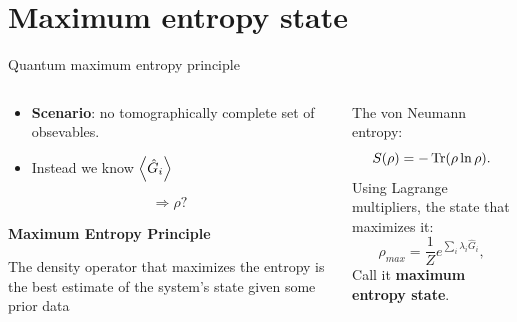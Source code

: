 \section{Maximum entropy state}

\begin{frame}{Quantum maximum entropy principle}
    \begin{columns}
        \begin{column}{0.5\textwidth}
            \begin{itemize}
                \item \textbf{Scenario}: no tomographically complete set of obsevables.
                \item Instead we know $\expval{\hat{G}_{i}}$
            \end{itemize}
            \begin{equation*}
                \Longrightarrow \rho\text{?}
            \end{equation*}
            \vspace{0.1cm}

            \textbf{Maximum Entropy Principle}
            \begin{tcolorbox}
                The density operator that maximizes the entropy is the best estimate of the system's state given some prior data
            \end{tcolorbox}
            \vspace{0.5cm}
        \end{column}
        \begin{column}{0.5\textwidth}
            The von Neumann entropy:
            \begin{equation*}
                S(\rho)=-\Tr(\rho\ln{\rho}).
            \end{equation*}
            Using Lagrange multipliers, the state that maximizes it:
            \begin{equation*}
                \rho_{max}=\frac{1}{Z}e^{\sum_{i}\lambda_{i}\hat{G}_{i}},
            \end{equation*}
            Call it \textbf{maximum entropy state}.
        \end{column}
    \end{columns}
\end{frame}

